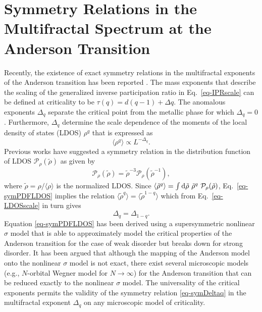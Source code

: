 \section{Symmetry Relations in the Multifractal Spectrum at the Anderson Transition}
\label{sec-symmetry}

Recently, the existence of exact symmetry relations in the multifractal exponents of the Anderson transition has been reported \cite{MirFME06}.
The mass exponents that describe the scaling of the generalized inverse participation ratio in Eq.~\eqref{eq-IPRscale} can be defined at criticality to be $\tau(q)=d(q-1)+\Delta q$.
The anomalous exponents $\Delta_q$ separate the critical point from the metallic phase for which $\Delta_q=0$.
Furthermore, $\Delta_q$ determine the scale dependence of the moments of the local density of states (LDOS) $\rho^q$ \cite{EveMM08} that is expressed as 
%
\begin{equation}
\label{eq-LDOSscale}
\langle\rho^q\rangle\propto L^{-\Delta_q}. 
\end{equation}
%
Previous works have suggested a symmetry relation in the distribution function of LDOS $\mathcal{P}_\rho(\tilde{\rho})$ as given by
%
\begin{equation}
 \label{eq-symPDFLDOS}
 \mathcal{P}_\rho(\tilde{\rho})=\tilde{\rho}^{-3}\mathcal{P}_\rho(\tilde{\rho}^{-1}),
\end{equation}
%
where $\tilde{\rho}=\rho/\langle\rho\rangle$ is the normalized LDOS.
Since $\langle\tilde{\rho}^q\rangle=\int \mathrm{d}\tilde{\rho}~\tilde{\rho}^q~\mathcal{P}_\rho(\tilde{\rho})$, Eq.~\eqref{eq-symPDFLDOS} implies the relation $\langle\tilde{\rho}^q\rangle=\langle\tilde{\rho}^{1-q}\rangle$ which from Eq.~\eqref{eq-LDOSscale} in turn gives
%
\begin{equation}
\label{eq-symDeltaq}
 \Delta_q = \Delta_{1-q}.
\end{equation}
%
Equation \eqref{eq-symPDFLDOS} has been derived using a supersymmetric nonlinear $\sigma$ model \cite{MirF94} that is able to approximately model the critical properties of the Anderson transition for the case of weak disorder but breaks down for strong disorder.
It has been argued that although the mapping of the Anderson model onto the nonlinear $\sigma$ model is not exact, there exist several microscopic models (e.g., $N$-orbital Wegner model for $N\rightarrow\infty$) for the Anderson transition that can be reduced exactly to the nonlinear $\sigma$ model.  The universality of the critical exponents permits the validity of the symmetry relation \eqref{eq-symDeltaq} in the multifractal exponent $\Delta_q$ on any microscopic model of criticality.


